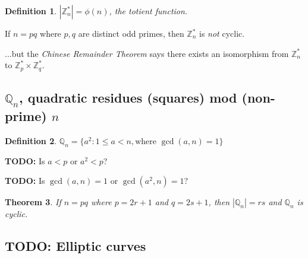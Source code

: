 \documentclass[12pt]{article}
\newtheorem{thm}{Theorem}[section]
\newtheorem{definition}[thm]{Definition}
\newcommand{\Zp}{\mathbb{Z}^{\ast}_p}
\newcommand{\Zq}{\mathbb{Z}^{\ast}_q}
\newcommand{\Zn}{\mathbb{Z}^{\ast}_n}
\newcommand{\Qn}{\mathbb{Q}_n}
\newcommand{\todo}{\textbf{TODO:} }
\newcommand{\sz}[1]{\left|#1\right|}
\begin{document}
\begin{definition}
$\sz{\Zn} = \phi(n)$, the \emph{totient} function.
\end{definition}

If $n = pq$ where $p,q$ are distinct odd primes, then $\Zn$ is \emph{not} cyclic.

...but the \emph{Chinese Remainder Theorem} says there exists an isomorphism
from $\Zn$ to $\Zp \times \Zq$.

\subsection{$\Qn$, quadratic residues (squares) mod (non-prime) $n$}
\begin{definition}
$\Qn = \{a^2 : 1 \le a < n, \text{where } \gcd(a, n) = 1\}$
\end{definition}

\todo Is $a < p$ or $a^2 < p$?

\todo Is $\gcd(a, n) = 1$ or $\gcd(a^2, n) = 1$?

\begin{thm}
If $n = pq$ where $p = 2r+1$ and $q = 2s+1$, then $\sz{\Qn} = rs$ and
$\Qn$ is cyclic.
\end{thm}

\subsection{TODO: Elliptic curves}

\nocite{*}
\printbibliography
\end{document}
